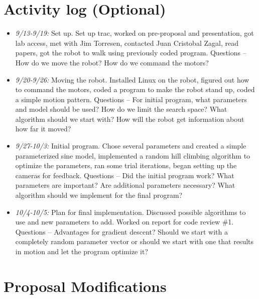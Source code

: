 \section{Activity log (Optional)}


\begin{itemize}
\item \emph{9/13-9/19:} Set up. Set up trac, worked on pre-proposal
  and presentation, got lab access, met with Jim Torresen, contacted
  Juan Cristobal Zagal, read papers, got the robot to walk using
  previously coded program. Questions -- How do we move the robot? How
  do we command the motors?
\item \emph{9/20-9/26:} Moving the robot. Installed Linux on the
  robot, figured out how to command the motors, coded a program to
  make the robot stand up, coded a simple motion pattern. Questions --
  For initial program, what parameters and model should be used? How
  do we limit the search space? What algorithm should we start with?
  How will the robot get information about how far it moved?
\item \emph{9/27-10/3:} Initial program. Chose several parameters and
  created a simple parameterized sine model, implemented a random hill
  climbing algorithm to optimize the parameters, ran some trial
  iterations, began setting up the cameras for feedback. Questions --
  Did the initial program work? What parameters are important? Are
  additional parameters necessary? What algorithm should we implement
  for the final program?
\item \emph{10/4-10/5:} Plan for final implementation. Discussed
  possible algorithms to use and new parameters to add. Worked on
  report for code review \#1. Questions -- Advantages for gradient
  descent? Should we start with a completely random parameter vector
  or should we start with one that results in motion and let the
  program optimize it?
\end{itemize}



\section{Proposal Modifications}

